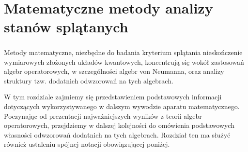 \chapter{Matematyczne metody analizy stanów splątanych}
\label{chp:preliminaries}

\paragraph{}
Metody matematyczne,
niezbędne do badania kryterium splątania nieskończenie wymiarowych złożonych
układów kwantowych, koncentrują się wokół zastosowań algebr operatorowych,
w szczególności algebr von Neumanna,
oraz analizy struktury tzw. dodatnich odwzorowań na tych algebrach.

W tym rozdziale zajmiemy się przedstawieniem podstawowych informacji dotyczących
wykorzystywanego w dalszym wywodzie aparatu matematycznego.
Poczynając od prezentacji najważniejszych wyników z teorii algebr operatorowych,
przejdziemy w dalszej kolejności do omówienia podstawowych własności
odwzorowań dodatnich na tych algebrach.
Rozdział ten ma służyć również ustaleniu spójnej notacji obowiązującej poniżej.

